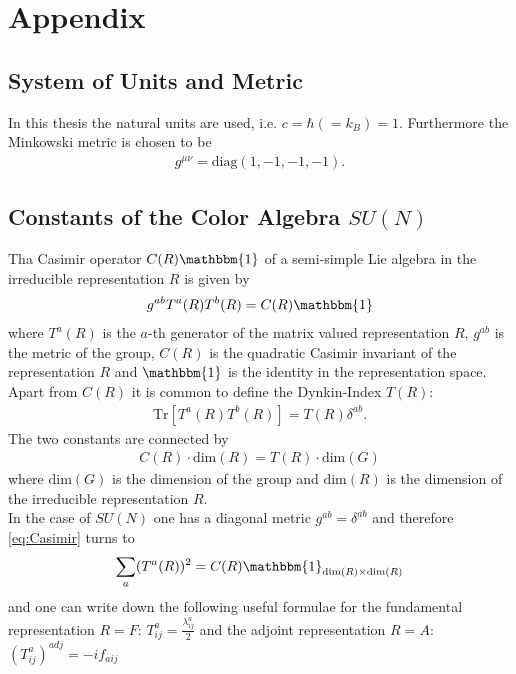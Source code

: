 \section{Appendix}


\subsection{System of Units and Metric}
In this thesis the natural units are used, i.e. $c= \hbar (= k_B) = 1$. Furthermore the Minkowski metric is chosen to be
\begin{align}
g^{\mu\nu} = \mathrm{diag}(1, -1, -1, -1).
\end{align}


\subsection{Constants of the Color Algebra $SU(N)$}\label{sec:coloralgebra}
Tha Casimir operator $C(R)\mathbbm{1}$ of a semi-simple Lie algebra in the irreducible representation $R$ is given by\cite{Marina}
\begin{align}
g^{ab} T^a(R)T^b(R) = C(R)\mathbbm{1} \label{eq:Casimir}
\end{align}
where $T^a(R)$ is the $a$-th generator of the matrix valued representation $R$, $g^{ab}$ is the metric of the group, $C(R)$ is the quadratic Casimir invariant of the representation $R$ and $\mathbbm{1}$ is the identity in the representation space.\\
Apart from $C(R)$ it is common to define the Dynkin-Index $T(R)$:
\begin{align}
\mathrm{Tr}\left[T^a(R)T^b(R)\right] = T(R)\delta^{ab}.
\end{align}
The two constants are connected by
\begin{align}
C(R) \cdot \mathrm{dim}(R) = T(R) \cdot \mathrm{dim}(G)
\end{align}
where $\mathrm{dim}(G)$ is the dimension of the group and $\mathrm{dim}(R)$ is the dimension of the irreducible representation $R$.\\
In the case of $SU(N)$ one has a diagonal metric $g^{ab} = \delta^{ab}$ and therefore \ref{eq:Casimir} turns to
\begin{align}
\sum_a (T^a(R))^2 = C(R)\mathbbm{1}_{\mathrm{dim}(R) \times \mathrm{dim}(R)}
\end{align}
and one can write down the following useful formulae for the fundamental representation $R=F$: $T^a_{ij} = \frac{\lambda^a_{ij}}{2}$ and the adjoint representation $R=A$: $(T^a_{ij})^{adj} = -if_{aij}$
